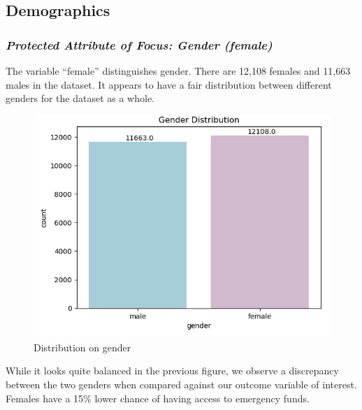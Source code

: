 \documentclass[12pt]{article}
\begin{document}
\hypertarget{demographics}{%
\subsection{Demographics}\label{demographics}}

\hypertarget{protected-attribute-of-focus-gender-female}{%
\subsubsection{\texorpdfstring{\emph{Protected Attribute of Focus:
Gender
(female)}}{Protected Attribute of Focus: Gender (female)}}\label{protected-attribute-of-focus-gender-female}}

The variable ``female'' distinguishes gender. There are 12,108 females
and 11,663 males in the dataset. It appears to have a fair distribution
between different genders for the dataset as a whole.

\begin{figure}

{\centering \includegraphics[width=1\linewidth]{graphs/f24_graph2} 

}

\caption{Distribution on gender}\label{fig:unnamed-chunk-5}
\end{figure}

While it looks quite balanced in the previous figure, we observe a
discrepancy between the two genders when compared against our outcome
variable of interest. Females have a 15\% lower chance of having access
to emergency funds.
\end{document}
